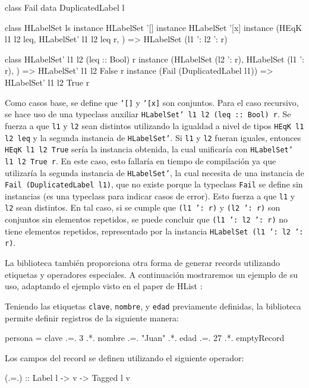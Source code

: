 \begin{code}
class Fail
data DuplicatedLabel l

class HLabelSet ls
instance HLabelSet '[]
instance HLabelSet '[x]
instance (HEqK l1 l2 leq, 
  HLabelSet' l1 l2 leq r,
  ) => HLabelSet (l1 ': l2 ': r)

class HLabelSet' l1 l2 (leq :: Bool) r
instance (HLabelSet (l2 ': r),
  HLabelSet (l1 ': r),
  ) => HLabelSet' l1 l2 False r
instance (Fail (DuplicatedLabel l1)) =>
  HLabelSet' l1 l2 True r
\end{code}

Como casos base, se define que \texttt{'[]} y \texttt{'[x]} son conjuntos. Para el caso recursivo, se hace uso de una typeclass auxiliar \texttt{HLabelSet' l1 l2 (leq :: Bool) r}. Se fuerza a que \texttt{l1} y \texttt{l2} sean distintos utilizando la igualdad a nivel de tipos \texttt{HEqK l1 l2 leq} y la segunda instancia de \texttt{HLabelSet'}. Si \texttt{l1} y \texttt{l2} fueran iguales, entonces \texttt{HEqK l1 l2 True} sería la instancia obtenida, la cual unificaría con \texttt{HLabelSet' l1 l2 True r}. En este caso, esto fallaría en tiempo de compilación ya que utilizaría la segunda instancia de \texttt{HLabelSet'}, la cual necesita de una instancia de \texttt{Fail (DuplicatedLabel l1)}, que no existe porque la typeclass \texttt{Fail} se define sin instancias (es una typeclass para indicar casos de error). Esto fuerza a que \texttt{l1} y \texttt{l2} sean distintos. En tal caso, si se cumple que \texttt{(l1 ': r)} y \texttt{(l2 ': r)} son conjuntos sin elementos repetidos, se puede concluir que \texttt{(l1 ': l2 ': r)} no tiene elementos repetidos, representado por la instancia \texttt{HLabelSet (l1 ': l2 ': r)}.

La biblioteca también proporciona otra forma de generar records utilizando etiquetas y operadores especiales. A continuación mostraremos un ejemplo de su uso, adaptando el ejemplo visto en el paper de HList :

Teniendo las etiquetas \texttt{clave}, \texttt{nombre}, y \texttt{edad} previamente definidas, la biblioteca permite definir registros de la siguiente manera:

\begin{code}
persona = clave .=. 3
  .*. nombre .=. "Juan"
  .*. edad .=. 27
  .*. emptyRecord
\end{code}

Los campos del record se definen utilizando el siguiente operador:

\begin{code}
(.=.) :: Label l -> v -> Tagged l v
\end{code}

